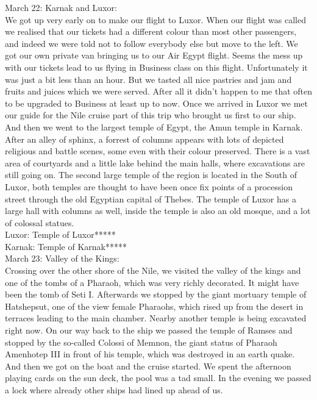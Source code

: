 March 22: Karnak and Luxor:\\
We got up very early on to make our flight to Luxor. When our flight was called we realised that our tickets had a different colour than most other passengers, and indeed we were told not to follow everybody else but move to the left. We got our own private van bringing us to our Air Egypt flight. Seems the mess up with our tickets lead to us flying in Business class on this flight. Unfortunately it was just a bit less than an hour. But we tasted all nice pastries and jam and fruits and juices which we were served. After all it didn't happen to me that often to be upgraded to Business at least up to now. Once we arrived in Luxor we met our guide for the Nile cruise part of this trip who brought us first to our ship. And then we went to the largest temple of Egypt, the Amun temple in Karnak. After an alley of sphinx, a forrest of columns appears with lots of depicted religious and battle scenes, some even with their colour preserved. There is a vast area of courtyards and a little lake behind the main halls, where excavations are still going on. The second large temple of the region is located in the South of Luxor, both temples are thought to have been once fix points of a procession street through the old Egyptian capital of Thebes. The temple of Luxor has a large hall with columns as well, inside the temple is also an old mosque, and a lot of colossal statues.\\

Luxor: Temple of Luxor*****\\
Karnak: Temple of Karnak*****\\

March 23: Valley of the Kings:\\
Crossing over the other shore of the Nile, we visited the valley of the kings and one of the tombs of a Pharaoh, which was very richly decorated. It might have been the tomb of Seti I. Afterwards we stopped by the giant mortuary temple of Hatshepsut, one of the view female Pharaohs, which rised up from the desert in terraces leading to the main chamber. Nearby another temple is being excavated right now. On our way back to the ship we passed the temple of Ramses and stopped by the so-called Colossi of Memnon, the giant status of Pharaoh Amenhotep III in front of his temple, which was destroyed in an earth quake. And then we got on the boat and the cruise started. We spent the afternoon playing cards on the sun deck, the pool was a tad small. In the evening we passed a lock where already other ships had lined up ahead of us.\\
  
